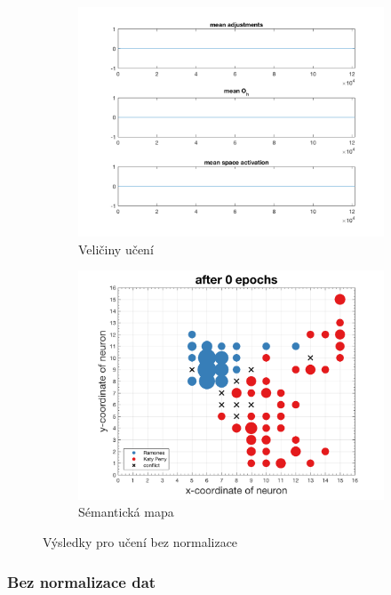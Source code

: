 \documentclass[thesis=M,czech]{FITthesis}[2012/06/26]
\begin{document}
\begin{figure}
\centering
\begin{subfigure}{.5\textwidth}
  \centering
  \includegraphics[width=.99\linewidth]{norm-learnattrs0.png}
  \caption{Veličiny učení}
  \label{fig:learnattrs0}
\end{subfigure}%
\begin{subfigure}{.5\textwidth}
  \centering
  \includegraphics[width=.99\linewidth]{exp_kp_ram_norm_0.png}
  \caption{Sémantická mapa}
  \label{fig:resmap0}
\end{subfigure}
\caption{Výsledky pro učení bez normalizace}
\label{fig:nonorm}
\end{figure}


\subsubsection*{Bez normalizace dat}\label{sec:nonorm}
\end{document}
